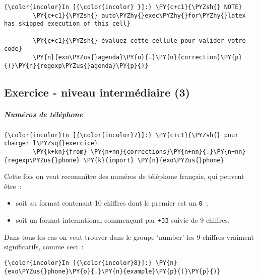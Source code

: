     \begin{Verbatim}[commandchars=\\\{\}]
{\color{incolor}In [{\color{incolor} }]:} \PY{c+c1}{\PYZsh{} NOTE}
        \PY{c+c1}{\PYZsh{} auto\PYZhy{}exec\PYZhy{}for\PYZhy{}latex has skipped execution of this cell}
        
        \PY{c+c1}{\PYZsh{} évaluez cette cellule pour valider votre code}
        \PY{n}{exo\PYZus{}agenda}\PY{o}{.}\PY{n}{correction}\PY{p}{(}\PY{n}{regexp\PYZus{}agenda}\PY{p}{)}
\end{Verbatim}


    \hypertarget{exercice---niveau-intermuxe9diaire-3}{%
\subsection{Exercice - niveau intermédiaire
(3)}\label{exercice---niveau-intermuxe9diaire-3}}

    \hypertarget{numuxe9ros-de-tuxe9luxe9phone}{%
\subparagraph{Numéros de
téléphone}\label{numuxe9ros-de-tuxe9luxe9phone}}

    \begin{Verbatim}[commandchars=\\\{\}]
{\color{incolor}In [{\color{incolor}7}]:} \PY{c+c1}{\PYZsh{} pour charger l\PYZsq{}exercice}
        \PY{k+kn}{from} \PY{n+nn}{corrections}\PY{n+nn}{.}\PY{n+nn}{regexp\PYZus{}phone} \PY{k}{import} \PY{n}{exo\PYZus{}phone}
\end{Verbatim}


    Cette fois on veut reconnaître des numéros de téléphone français, qui
peuvent être~:

\begin{itemize}
\tightlist
\item
  soit au format contenant 10 chiffres dont le premier est un
  \texttt{0}~;
\item
  soit un format international commençant par \texttt{+33} suivie de 9
  chiffres.
\end{itemize}

Dans tous les cas on veut trouver dans le groupe `number' les 9 chiffres
vraiment significatifs, comme ceci~:

    \begin{Verbatim}[commandchars=\\\{\}]
{\color{incolor}In [{\color{incolor}8}]:} \PY{n}{exo\PYZus{}phone}\PY{o}{.}\PY{n}{example}\PY{p}{(}\PY{p}{)}
\end{Verbatim}


